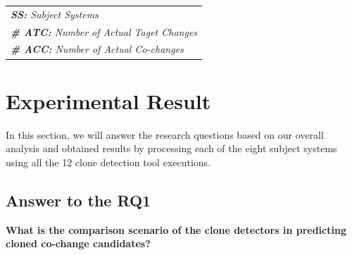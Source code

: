 \documentclass[review]{elsarticle}
\begin{document}
\begin{table}[htbp]
\begin{tabular}{lcccc}
\multicolumn{5}{l}{\textit{\textbf{SS:} Subject Systems}}                                                                                                                                         \\
\multicolumn{5}{l}{\textit{\textbf{\# ATC:} Number of   Actual Taget Changes}}                                                                                                                   \\
\multicolumn{5}{l}{\textit{\textbf{\# ACC:} Number of   Actual Co-changes}}                                                                                                                     
\end{tabular}
\end{table}

\section{Experimental Result}
\label{the-experimental-result}
In this section, we will answer the research questions based on our overall analysis and obtained results by processing each of the eight subject systems using all the 12 clone detection tool executions. 

\subsection{Answer to the \textbf{RQ1}}
\textbf{What is the comparison scenario of the clone detectors in predicting cloned co-change candidates?}
\end{document}

